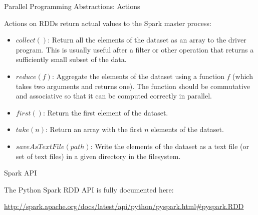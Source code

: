 \documentclass[serif,xcolor=pdftex,dvipsnames,table,hyperref={bookmarks=false,breaklinks}]{beamer}
\begin{document}
\begin{frame}[t]{Parallel Programming Abstractions: Actions}

Actions on RDDs return actual values to the Spark master process:

\begin{itemize}

\item $collect()$:    Return all the elements of the dataset as an array to 
the driver program. This is usually useful after a filter or other operation 
that returns a sufficiently small subset of the data. 

\pause\item $reduce(f)$:    Aggregate the elements of the dataset using a 
function $f$ (which takes two arguments and returns one). The function 
should be commutative and associative so that it can be computed correctly in 
parallel. 

\pause\item$first()$:         Return the first element of the dataset.

\pause\item$take(n)$:        Return an array with the first $n$ elements of the 
dataset. 

\pause\item$saveAsTextFile(path)$:    Write the elements of the dataset as a 
text file (or set of text files) in a given directory in the filesystem.

\end{itemize}

\end{frame}

\begin{frame}[t]{Spark API}

The Python Spark RDD API is fully documented here:

\center
\url{http://spark.apache.org/docs/latest/api/python/pyspark.html\#pyspark.RDD}

\end{frame}
\end{document}
